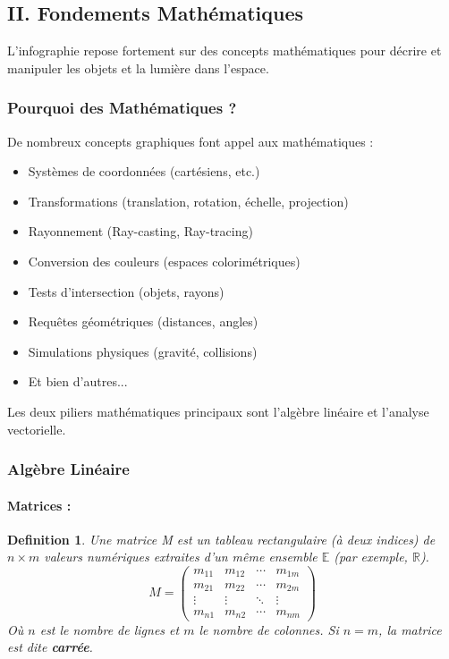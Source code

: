 \documentclass{article}
\newtheorem{definition}{Definition}
\begin{document}
\subsection{II. Fondements Mathématiques}

L'infographie repose fortement sur des concepts mathématiques pour décrire et manipuler les objets et la lumière dans l'espace.

\subsubsection{Pourquoi des Mathématiques ?}
De nombreux concepts graphiques font appel aux mathématiques :
\begin{itemize}
    \item Systèmes de coordonnées (cartésiens, etc.)
    \item Transformations (translation, rotation, échelle, projection)
    \item Rayonnement (Ray-casting, Ray-tracing)
    \item Conversion des couleurs (espaces colorimétriques)
    \item Tests d'intersection (objets, rayons)
    \item Requêtes géométriques (distances, angles)
    \item Simulations physiques (gravité, collisions)
    \item Et bien d'autres...
\end{itemize}
Les deux piliers mathématiques principaux sont l'algèbre linéaire et l'analyse vectorielle.

\subsubsection{Algèbre Linéaire}

\paragraph{Matrices :}
\begin{definition}
Une matrice M est un tableau rectangulaire (à deux indices) de $n \times m$ valeurs numériques extraites d'un même ensemble $\mathbb{E}$ (par exemple, $\mathbb{R}$).
\[ M =
\begin{pmatrix}
m_{11} & m_{12} & \cdots & m_{1m} \\
m_{21} & m_{22} & \cdots & m_{2m} \\
\vdots & \vdots & \ddots & \vdots \\
m_{n1} & m_{n2} & \cdots & m_{nm}
\end{pmatrix}
\]
Où $n$ est le nombre de lignes et $m$ le nombre de colonnes.
Si $n = m$, la matrice est dite \textbf{carrée}.
\end{definition}
\end{document}
